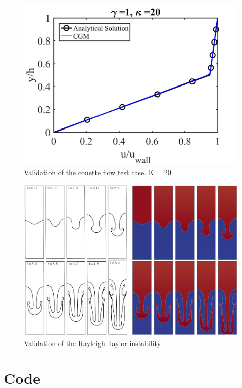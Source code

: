 \documentclass[12pt, openany]{book}
\begin{document}
    \begin{figure}[H]
       	\centering
       	\includegraphics[width=\linewidth]{Resources/Images/AntonioValid/E_G1_K20.jpg}
       	\caption{Validation of the couette flow test case. K = 20}
       	\label{fig:couett20}
    \end{figure}
    
    \begin{figure}[H]
       	\centering
       	\includegraphics[width=\linewidth]{Resources/Images/AntonioValid/RTI_Re256.PNG}
       	\caption{Validation of the Rayleigh-Taylor instability}
       	\label{fig:rtvalid}
    \end{figure}
    
\chapter{Code}
\end{document}
